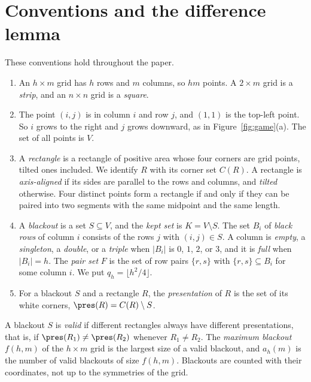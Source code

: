 \section{Conventions and the difference lemma}\label{sec:conv}

These conventions hold throughout the paper.
\begin{enumerate}[(1),leftmargin=*]
\item An $h\times m$ grid has $h$ rows and $m$ columns, so $hm$ points. A $2\times m$
grid is a \emph{strip}, and an $n\times n$ grid is a \emph{square}.
\item The point $(i,j)$ is in column $i$ and row $j$, and $(1,1)$ is the top-left
point. So $i$ grows to the right and $j$ grows downward, as in
Figure~\ref{fig:game}(a). The set of all points is $V$.
\item A \emph{rectangle} is a rectangle of positive area whose four corners are grid
points, tilted ones included. We identify $R$ with its corner set $C(R)$. A
rectangle is \emph{axis-aligned} if its sides are parallel to the rows and columns,
and \emph{tilted} otherwise. Four distinct points form a rectangle if and only if
they can be paired into two segments with the same midpoint and the same length.
\item A \emph{blackout} is a set $S\subseteq V$, and the \emph{kept set} is
$K=V\setminus S$. The set $B_i$ of \emph{black rows} of
column $i$ consists of the rows $j$ with $(i,j)\in S$. A column is \emph{empty}, a
\emph{singleton}, a \emph{double}, or a \emph{triple} when $|B_i|$ is $0$, $1$, $2$,
or $3$, and it is \emph{full} when $|B_i|=h$. The \emph{pair set} $F$ is the set of
row pairs $\{r,s\}$ with $\{r,s\}\subseteq B_i$ for some column $i$. We put
$q_h=\lfloor h^2/4\rfloor$.
\item For a blackout $S$ and a rectangle $R$, the \emph{presentation} of $R$ is the
set of its white corners, $\pres(R)=C(R)\setminus S$.
\end{enumerate}

\begin{definition}\label{def:valid}
A blackout $S$ is \emph{valid} if different rectangles always have different
presentations, that is, if $\pres(R_1)\ne\pres(R_2)$ whenever $R_1\ne R_2$. The
\emph{maximum blackout} $f(h,m)$ of the $h\times m$ grid is the largest size of a
valid blackout, and $a_h(m)$ is the number of valid blackouts of size $f(h,m)$.
Blackouts are counted with their coordinates, not up to the symmetries of the grid.
\end{definition}

